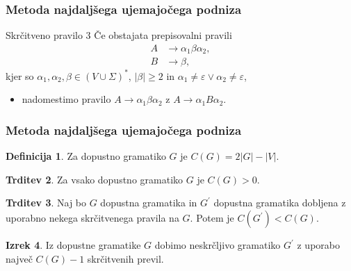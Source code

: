 \documentclass{beamer}
\theoremstyle{definition}
\newtheorem{definicija}{Definicija}[section]
\newtheorem{izrek}[definicija]{Izrek}
\newtheorem{trditev}[definicija]{Trditev}
\providecommand{\abs}[1]{\left\lvert #1 \right\rvert}
\begin{document}
\begin{frame}
    \frametitle{Metoda najdaljšega ujemajočega podniza}
    \begin{block}{Skrčitveno pravilo 3}
        Če obstajata prepisovalni pravili
        \begin{align*}
            A &\rightarrow \alpha_1 \beta \alpha_2, \\
            B &\rightarrow \beta,
        \end{align*}
        kjer so $\alpha_1, \alpha_2, \beta \in (V \cup \Sigma)^*$, $\abs{\beta} \geq 2$
        in $\alpha_1 \neq \varepsilon \vee \alpha_2 \neq \varepsilon$,
        \begin{itemize}
            \item nadomestimo pravilo $A \rightarrow \alpha_1 \beta \alpha_2$ z
            $A \rightarrow \alpha_1 B \alpha_2$.
        \end{itemize}
    \end{block}
\end{frame}

\begin{frame}
    \frametitle{Metoda najdaljšega ujemajočega podniza}
    \begin{definicija}
        Za dopustno gramatiko $G$ je $C(G) = 2 \abs{G} - \abs{V}$.
    \end{definicija}
    \pause
    \begin{trditev}
        Za vsako dopustno gramatiko $G$ je $C(G) > 0$.
    \end{trditev}
    \begin{trditev}
        Naj bo $G$ dopustna gramatika in $G^\prime$ dopustna gramatika dobljena z uporabno nekega
        skrčitvenega pravila na $G$. Potem je $C(G^\prime) < C(G)$. 
    \end{trditev}
    \pause
    \begin{izrek}
        Iz dopustne gramatike $G$ dobimo neskrčljivo gramatiko $G^\prime$ z uporabo največ 
        $C(G) - 1$ skrčitvenih previl.
    \end{izrek}
\end{frame}
\end{document}
